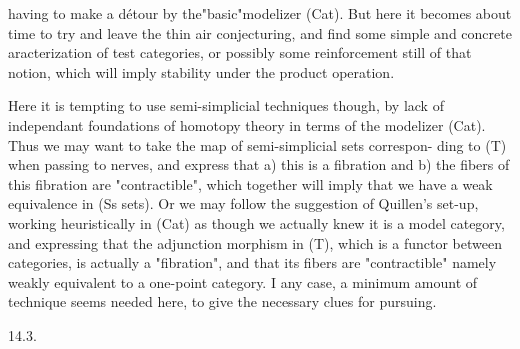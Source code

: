 having to make a détour by the"basic"modelizer (Cat). But here it becomes
about time to try and leave the thin air conjecturing, and find some simple
 and concrete aracterization of test categories,  or possibly some
reinforcement still of that notion, which will imply stability under the
product operation.

Here it is tempting to use semi-simplicial techniques though, by lack
of independant foundations of homotopy theory in terms of the modelizer
(Cat). Thus we may want to take the map of semi-simplicial sets correspon-%
ding to (T) when passing to nerves, and express that a) this is a fibration
and b) the fibers of this fibration are "contractible", which together
will imply that we have a weak equivalence in (Ss sets). Or we may follow
the suggestion of Quillen's set-up, working heuristically in (Cat) as though
we actually knew it is a model category, and expressing that the adjunction
morphism in (T), which is a functor between categories, is actually a
"fibration", and that its fibers are "contractible" namely weakly equivalent
to a one-point category. I any case, a minimum amount of technique seems
needed here, to give the necessary clues for pursuing.

14.3.

